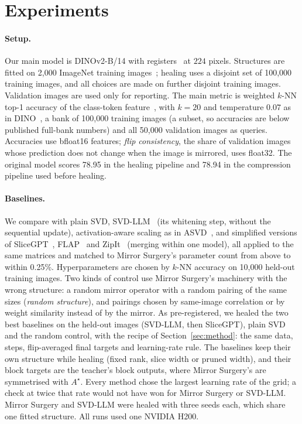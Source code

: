 \section{Experiments}
\label{sec:experiments}

\paragraph{Setup.}
Our main model is DINOv2-B/14 with registers~\citep{oquab2024dinov2,darcet2024registers} at $224$ pixels. Structures
are fitted on 2{,}000 ImageNet training images~\citep{deng2009imagenet}; healing uses a disjoint set of 100{,}000
training images, and all choices are made on further disjoint training images. Validation images are used only for
reporting. The main metric is weighted $k$-NN top-1 accuracy of the class-token feature~\citep{wu2018unsupervised},
with $k=20$ and temperature $0.07$ as in DINO~\citep{caron2021emerging}, a bank of 100{,}000 training images (a subset,
so accuracies are below published full-bank numbers) and all 50{,}000 validation images as queries. Accuracies use
bfloat16 features; \emph{flip consistency}, the share of validation images whose prediction does not change when the
image is mirrored, uses float32. The original model scores 78.95 in the healing pipeline and 78.94 in the compression
pipeline used before healing.

\paragraph{Baselines.}
We compare with plain SVD, SVD-LLM~\citep{wang2025svdllm} (its whitening step, without the sequential update),
activation-aware scaling as in ASVD~\citep{yuan2023asvd}, and simplified versions of SliceGPT~\citep{ashkboos2024slicegpt},
FLAP~\citep{an2024flap} and ZipIt~\citep{stoica2024zipit} (merging within one model), all applied to the same
matrices and matched to Mirror Surgery's parameter count from above to within 0.25\%. Hyperparameters are chosen by
$k$-NN accuracy on 10{,}000 held-out training images. Two kinds of control use Mirror Surgery's machinery with the
wrong structure: a random mirror operator with a random pairing of the same sizes (\emph{random structure}), and
pairings chosen by same-image correlation or by weight similarity instead of by the mirror. As pre-registered, we
healed the two best baselines on the held-out images (SVD-LLM, then SliceGPT), plain SVD and the random control, with
the recipe of Section~\ref{sec:method}: the same data, steps, flip-averaged final targets and learning-rate rule. The
baselines keep their own structure while healing (fixed rank, slice width or pruned width), and their block targets
are the teacher's block outputs, where Mirror Surgery's are symmetrised with $A^\star$. Every method chose the largest
learning rate of the grid; a check at twice that rate would not have won for Mirror Surgery or SVD-LLM. Mirror
Surgery and SVD-LLM were healed with three seeds each, which share one fitted structure. All runs used one NVIDIA H200.

